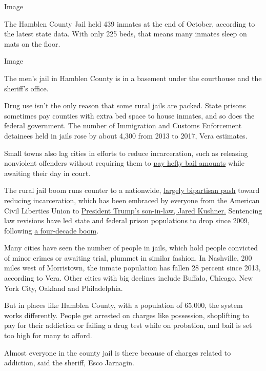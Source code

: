 Image

The Hamblen County Jail held 439 inmates at the end of October,
according to the latest state data. With only 225 beds, that means many
inmates sleep on mats on the floor.

Image

The men's jail in Hamblen County is in a basement under the courthouse
and the sheriff's office.

Drug use isn't the only reason that some rural jails are packed. State
prisons sometimes pay counties with extra bed space to house inmates,
and so does the federal government. The number of Immigration and
Customs Enforcement detainees held in jails rose by about 4,300 from
2013 to 2017, Vera estimates.

Small towns also lag cities in efforts to reduce incarceration, such as
releasing nonviolent offenders without requiring them to
\href{https://www.nytimes3xbfgragh.onion/2018/03/31/us/bail-bonds-extortion.html}{pay
hefty bail amounts} while awaiting their day in court.

The rural jail boom runs counter to a nationwide,
\href{https://www.nytimes3xbfgragh.onion/2018/12/18/us/politics/senate-criminal-justice-bill.html}{largely
bipartisan push} toward reducing incarceration, which has been embraced
by everyone from the American Civil Liberties Union to
\href{https://www.nytimes3xbfgragh.onion/2018/12/14/us/politics/jared-kushner-criminal-justice-bill.html}{President
Trump's son-in-law, Jared Kushner.} Sentencing law revisions have led
state and federal prison populations to drop since 2009, following
\href{https://www.sentencingproject.org/criminal-justice-facts/}{a
four-decade boom}.

Many cities have seen the number of people in jails, which hold people
convicted of minor crimes or awaiting trial, plummet in similar fashion.
In Nashville, 200 miles west of Morristown, the inmate population has
fallen 28 percent since 2013, according to Vera. Other cities with big
declines include Buffalo, Chicago, New York City, Oakland and
Philadelphia.

But in places like Hamblen County, with a population of 65,000, the
system works differently. People get arrested on charges like
possession, shoplifting to pay for their addiction or failing a drug
test while on probation, and bail is set too high for many to afford.

Almost everyone in the county jail is there because of charges related
to addiction, said the sheriff, Esco Jarnagin.

